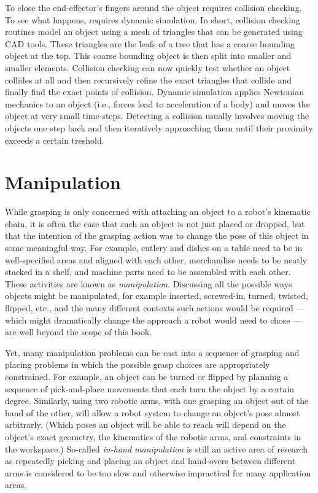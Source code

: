 To close the end-effector's fingers around the object requires collision checking. To see what happens, requires dynamic simulation. In short, collision checking routines model an object using a mesh of triangles that can be generated using CAD tools. These triangles are the leafs of a tree that has a coarse bounding object at the top. This coarse bounding object is then split into smaller and smaller elements. Collision checking can now quickly test whether an object collides at all and then recursively refine the exact triangles that collide and finally find the exact points of collision. Dynamic simulation applies Newtonian mechanics to an object (i.e., forces lead to acceleration of a body) and moves the object at very small time-steps. Detecting a collision usually involves moving the objects one step back and then iteratively approaching them until their proximity exceeds a certain treshold.

\section{Manipulation}\label{sec:manipulation}
While grasping is only concerned with attaching an object to a robot's kinematic chain, it is often the case that such an object is not just placed or dropped, but that the intention of the grasping action was to change the pose of this object in some meaningful way. For example, cutlery and dishes on a table need to be in well-specified areas and aligned with each other, merchandise needs to be neatly stacked in a shelf, and machine parts need to be assembled with each other. These activities are known as \emph{manipulation}. Discussing all the possible ways objects might be manipulated, for example inserted, screwed-in, turned, twisted, flipped, etc., and the many different contexts such actions would be required --- which might dramatically change the approach a robot would need to chose --- are well beyond the scope of this book.

Yet, many manipulation problems can be cast into a sequence of grasping and placing problems in which the possible grasp choices are appropriately constrained. For example, an object can be turned or flipped by planning a sequence of pick-and-place movements that each turn the object by a certain degree. Similarly, using two robotic arms, with one grasping an object out of the hand of the other, will allow a robot system to change an object's pose almost arbitrarly. (Which poses an object will be able to reach will depend on the object's exact geometry, the kinematics of the robotic arms, and constraints in the workspace.) So-called \emph{in-hand manipulation} is still an active area of research as  repeatedly picking and placing an object and hand-overs between different arms is considered to be too slow and otherwise impractical for many application areas.  

